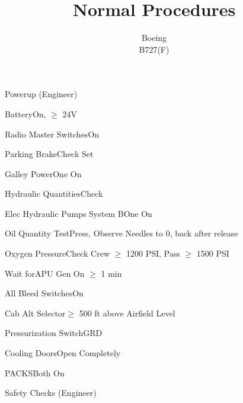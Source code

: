 \documentclass[sim-use]{checklist}
\title{Normal Procedures}
\subtitle{Boeing \\ B727(F)}
\begin{document}
 
\begin{checklist}{Powerup (Engineer)}
    \item{Battery}{On, $\ge$ 24V}
    \item{Radio Master Switches}{On}
    \item{Parking Brake}{Check Set}
    \item{Galley Power}{One On}
    \item{Hydraulic Quantities}{Check}
    \item{Elec Hydraulic Pumps System B}{One On}
    \item{Oil Quantity Test}{Press, Observe Needles to 0, back after release}
    \item{Oxygen Pressure}{Check Crew $\ge$ 1200 PSI, Pass $\ge$ 1500 PSI}
     {
        \item{Wait for}{APU Gen On $\ge$ 1 min}
        \item{All Bleed Switches}{On}
        \item{Cab Alt Selector}{$\ge$ 500 ft above Airfield Level}
        \item{Pressurization Switch}{GRD}
        \item{Cooling Doors}{Open Completely}
        \item{PACKS}{Both On}
    }
\end{checklist}

\begin{checklist}{Safety Checks (Engineer)}
\end{checklist}
\end{document}
